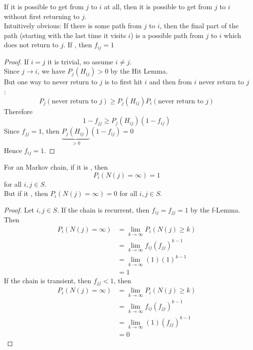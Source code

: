 \documentclass[11pt]{article}
\renewcommand{\limit}[1]{\underset{{#1} \rightarrow \infty}{\lim}}
\begin{document}
  	\remark
  	If it is possible to get from $j$ to $i$ at all, then it is possible to get from $j$ to $i$ without first returning to $j$. \\
  	Intuitively obvious: If there is some path from $j$ to $i$, then the final part of the path (starting with the last time it visits $i$) is a possible path from $j$ to $i$ which does not return to $j$.
  	\lemma[f-Lemma] If , then $f_{ij} = 1$
  	\begin{proof}
  		If $i = j$ it is trivial, so assume $i \neq j$. \\
  		Since $j \rightarrow i$, we have $P_j(H_{ij}) > 0$ by the Hit Lemma.\\
  		But one way to never return to $j$ is to first hit $i$ and then from $i$ never return to $j$:
  		$$P_j(\text{never return to $j$}) \geq P_j(H_{ij})P_i(\text{never return to $j$})$$
  		Therefore
  		$$1 - f_{jj} \geq P_j(H_{ij})(1 - f_{ij})$$
  		Since $f_{jj} = 1$, then $\underbrace{P_j(H_{ij})}_{>0}(1 - f_{ij}) = 0$\\
  		Hence $f_{ij} = 1$.
  		
  	\end{proof}
    
     For an  Markov chain, if it is , then $$P_i(N(j) = \infty) = 1$$ for all $i, j \in S$. \\
    But if it , then $P_i(N(j) = \infty) = 0$ for all $i, j \in S$.
    \begin{proof}
    	Let $i, j \in S$. If the chain is recurrent, then $f_{ij} = f_{jj} = 1$ by the f-Lemma.\\
    	Then
    	\begin{align*}
    		P_i(N(j) = \infty) &= \limit{k}P_i(N(j) \geq k) \\
    		&= \limit{k} f_{ij}(f_{jj})^{k-1} \\
    		&= \limit{k} (1)(1)^{k-1} \\
    		&= 1
    	\end{align*}
    	If the chain is transient, then $f_{jj} < 1$, then
    	 \begin{align*}
    		P_i(N(j) = \infty) &= \limit{k}P_i(N(j) \geq k) \\
    		&= \limit{k} f_{ij}(f_{jj})^{k-1} \\
    		&= \limit{k} (1)(f_{jj})^{k-1} \\
    		&= 0
    	\end{align*}
    	
    \end{proof}
    
\end{document}
